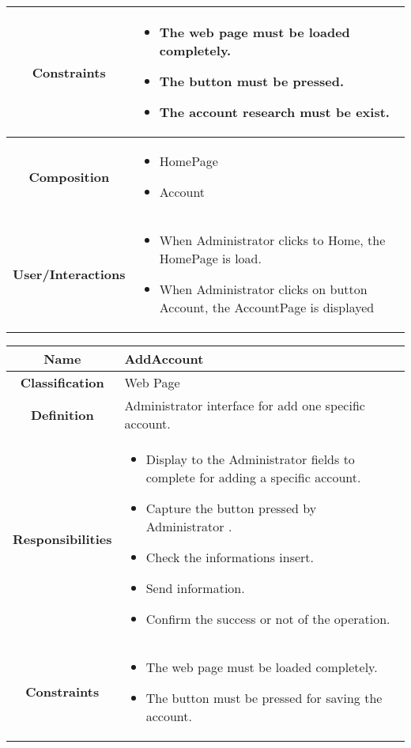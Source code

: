 \documentclass[11pt, a4paper,titlepage]{article}
\begin{document}
\begin{enumerate}
\begin{tabularx}{\textwidth}{| c | X |}
	\\
	\hline
	\textbf{Constraints} &
	\begin{itemize}
		\item  The web page must be loaded completely.
		\item The button must be pressed.
		\item The account research must be exist.
	\end{itemize}
	\\
	\hline
	\textbf{Composition} &
	\begin{itemize}
		\item HomePage
		\item Account
	\end{itemize}
	\\
	\hline
	\textbf{User/Interactions} &
	\begin{itemize}
		\item When Administrator clicks to Home, the HomePage is load.	
		\item When Administrator clicks on button Account, the AccountPage is displayed
	\end{itemize}
	\\
	\hline 
\end{tabularx}
\begin{tabularx}{\textwidth}{| c | X |}
	\hline
	\textbf{Name} &
	AddAccount
	\\
	\hline
	\textbf{Classification} &
	Web Page
	\\
	\hline
	\textbf{Definition} &
	Administrator interface for add one specific account.\\
	\hline
	\textbf{Responsibilities} &
	\begin{itemize}
		\item Display to the Administrator fields to complete for adding a specific account.
		\item Capture the button pressed by Administrator .	
		\item Check the informations insert.
		\item Send information.
		\item Confirm the success or not of the operation.
	\end{itemize}
	\\
	\hline
	\textbf{Constraints} &
	\begin{itemize}
		\item The web page must be loaded completely.
		\item The button must be pressed for saving the account.
	\end{itemize}

\end{tabularx}
\end{enumerate}
\end{document}
